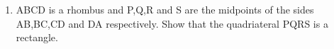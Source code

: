 \begin{frame}
\begin{enumerate}
\conti
\item ABCD is a rhombus and P,Q,R and S are the midpoints of the sides AB,BC,CD and DA respectively. Show that the quadriateral PQRS is a rectangle.
\seti
\end{enumerate}
\end{frame}